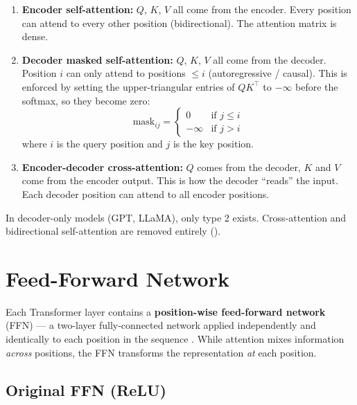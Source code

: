 \documentclass[11pt,a4paper]{article}
\begin{document}
\begin{enumerate}[nosep]
  \item \textbf{Encoder self-attention:} $Q$, $K$, $V$ all come from the encoder.
    Every position can attend to every other position (bidirectional). The attention
    matrix is dense.

  \item \textbf{Decoder masked self-attention:} $Q$, $K$, $V$ all come from the decoder.
    Position $i$ can only attend to positions $\leq i$ (autoregressive / causal). This
    is enforced by setting the upper-triangular entries of $QK^\top$ to $-\infty$ before
    the softmax, so they become zero:
    \begin{equation}
      \text{mask}_{ij} =
      \begin{cases}
        0 & \text{if } j \leq i \\
        -\infty & \text{if } j > i
      \end{cases}
    \end{equation}
    where $i$ is the query position and $j$ is the key position.

  \item \textbf{Encoder-decoder cross-attention:} $Q$ comes from the decoder, $K$ and $V$
    come from the encoder output. This is how the decoder ``reads'' the input. Each
    decoder position can attend to all encoder positions.
\end{enumerate}

In decoder-only models (GPT, LLaMA), only type 2 exists. Cross-attention and bidirectional
self-attention are removed entirely ().


\section{Feed-Forward Network}
\label{sec:ffn}

Each Transformer layer contains a \textbf{position-wise feed-forward network} (FFN) ---
a two-layer fully-connected network applied independently and identically to each position
in the sequence \cite{vaswani2017}. While attention mixes information \emph{across}
positions, the FFN transforms the representation \emph{at} each position.

\subsection{Original FFN (ReLU)}
\end{document}
